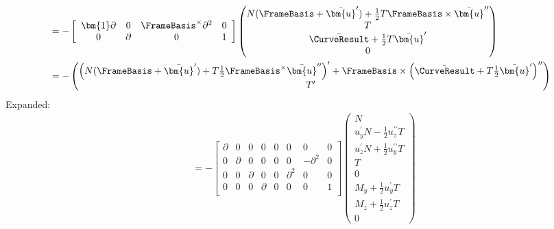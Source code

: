 \begin{equation*}
\begin{aligned}
&= 
-\left[\begin{array}{cccc}
\bm{1}\partial & 0 & \FrameBasis^{\times}\partial^2 & 0\\
0 & \partial & 0 & 1
\end{array}\right]
\begin{pmatrix}
N (\FrameBasis  + \bar{\bm{u}}') + \frac{1}{2} T \FrameBasis  \times \bar{\bm{u}}'' \\
T \\ 
\bar{\CurveResult} + \frac{1}{2} T \bar{\bm{u}}' \\
 0
\end{pmatrix} \\
&= 
-\begin{pmatrix}
\left(N (\FrameBasis  + \bar{\bm{u}}') + T\frac{1}{2}\FrameBasis^\times \bar{\bm{u}}'' \right)' + \FrameBasis \times\left(\bar{\CurveResult} + T \frac{1}{2} \bar{\bm{u}}' \right)''\\
T' \\ 
\end{pmatrix} \\
\end{aligned}
\end{equation*}
Expanded:
\begin{equation*}
\begin{aligned}
&=
-\left[\begin{array}{ccc|c|ccc|c}
\partial & 0 & 0 & 0 & 0 & 0 & 0 & 0 \\
0 & \partial & 0    & 0 & 0 & 0 & -\partial^2 & 0 \\
0 & 0 & \partial    & 0 & 0 & \partial^2 & 0 & 0 \\ \hline
0 & 0 & 0            & \partial & 0 & 0 & 0 & 1 \\
\end{array}\right]
\begin{pmatrix}
N \\
u_y^{\prime} N - \frac{1}{2} u_z^{\prime\prime} T \\
u_z^{\prime} N + \frac{1}{2} u_y^{\prime\prime} T \\ \hline
T \\ \hline
0 \\
 M_y + \frac{1}{2}u_y^{\prime} T \\
 M_z + \frac{1}{2}u_z^{\prime} T \\ \hline
 0
\end{pmatrix} \\
\end{aligned}
\end{equation*}

